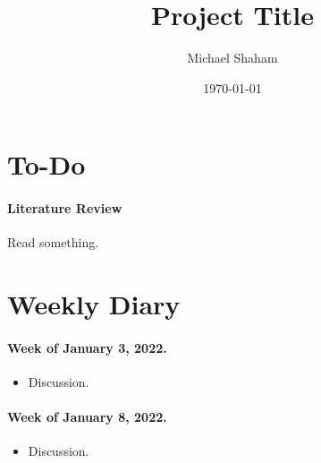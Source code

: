 \documentclass[12pt]{article}
\title{Project Title}
\author{Michael Shaham}
\date{\monthyeardate\today}
\begin{document}
\maketitle

\section{To-Do}

\paragraph{Literature Review}

\begin{todolist}
\item Read something. \cite{SW:57}
\end{todolist}

\section{Weekly Diary}

\paragraph{Week of January 3, 2022.} 
\begin{itemize}
    \item Discussion.
\end{itemize}

\paragraph{Week of January 8, 2022.}
\begin{itemize}
    \item Discussion.
\end{itemize}

\newpage


\end{document}
